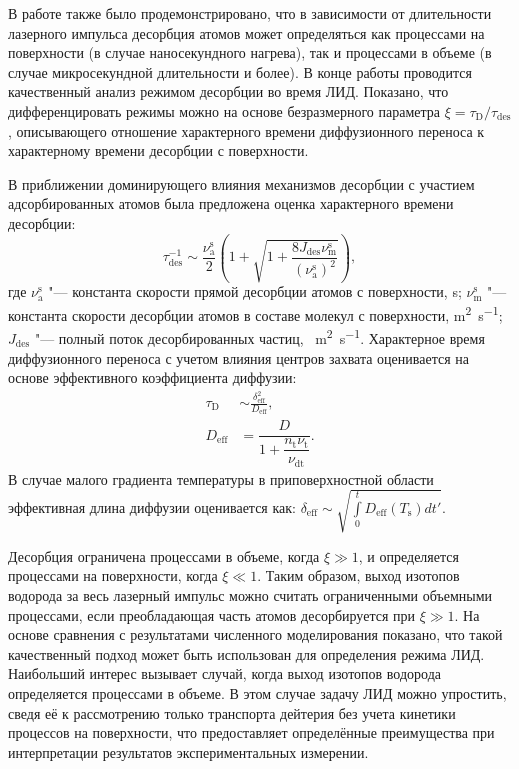 В работе также было продемонстрировано, что в зависимости от длительности лазерного импульса десорбция атомов может определяться как процессами на поверхности (в случае наносекундного нагрева), так и процессами в объеме (в случае микросекундной длительности и более). В конце работы проводится качественный анализ режимом десорбции во время ЛИД. Показано, что дифференцировать режимы можно на основе безразмерного параметра \( \xi=\tau_\mathrm{D}/\tau_\mathrm{des} \), описывающего отношение характерного времени диффузионного переноса к характерному времени десорбции с поверхности. 

В приближении доминирующего влияния механизмов десорбции с участием адсорбированных атомов была предложена оценка характерного времени десорбции:
\begin{equation}
    \tau_\mathrm{des}^{-1} \sim \dfrac{\nu_\mathrm{a}^\mathrm{s}}{2} \left( 1 + \sqrt{1+\dfrac{8J_\mathrm{des}\nu_\mathrm{m}^\mathrm{s}}{(\nu_\mathrm{a}^\mathrm{s})^2}} \right),
\end{equation}
где \( \nu_\mathrm{a}^\mathrm{s} \) "--- константа скорости прямой десорбции атомов с поверхности, \si{\second}; \( \nu_\mathrm{m}^\mathrm{s} \) "--- константа скорости десорбции атомов в составе молекул с поверхности, \si{\meter\squared\per\second}; \( J_\mathrm{des} \) "--- полный поток десорбированных частиц, \si{\per\meter\squared\per\second}. Характерное время диффузионного переноса с учетом влияния центров захвата оценивается на основе эффективного коэффициента диффузии:
\begin{subequations}
    \begin{align}
        \tau_\mathrm{D}         & \sim \frac{\delta_\mathrm{eff}^2}{D_\mathrm{eff}}, \\
        D_\mathrm{eff} & = \dfrac{D}{1+\dfrac{n_\mathrm{t}\nu_\mathrm{t}}{\nu_\mathrm{dt}}}. 
    \end{align}
\end{subequations}
В случае малого градиента температуры в приповерхностной области эффективная длина диффузии оценивается как: \( \delta_\mathrm{eff} \sim \sqrt{\int\limits_0^t D_\mathrm{eff}(T_\mathrm{s})dt'}\). 

Десорбция ограничена процессами в объеме, когда \( \xi \gg 1 \), и определяется процессами на поверхности, когда \( \xi \ll 1 \). Таким образом, выход изотопов водорода за весь лазерный импульс можно считать ограниченными объемными процессами, если преобладающая часть атомов десорбируется при \( \xi \gg 1 \). На основе сравнения с результатами численного моделирования показано, что такой качественный подход может быть использован для определения режима ЛИД. Наибольший интерес вызывает случай, когда выход изотопов водорода определяется процессами в объеме. В этом случае задачу ЛИД можно упростить, сведя её к рассмотрению только транспорта дейтерия без учета кинетики процессов на поверхности, что предоставляет определённые преимущества при интерпретации результатов экспериментальных измерении.

